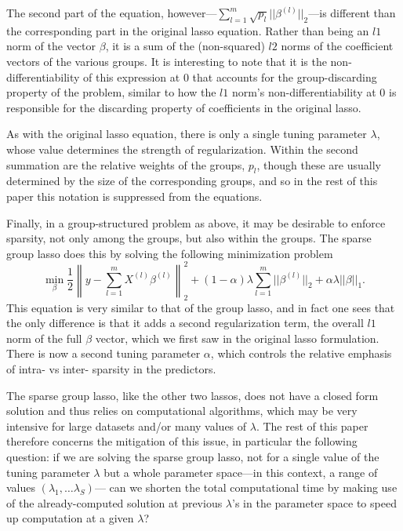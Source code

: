 \documentclass[12pt]{article}
\newcommand{\norm}[1]{\left\lVert #1 \right\rVert}
\begin{document}
The second part of the equation, however---$\sum_{l=1}^m\sqrt{p_l}||\beta^{(l)}||_2$---is different than the corresponding part in the original lasso equation. Rather than being an $l1$ norm of the vector $\beta$, it is a sum of the (non-squared) $l2$ norms of the coefficient vectors of the various groups. It is interesting to note that it is the non-differentiability of this expression at $0$ that accounts for the group-discarding property of the problem, similar to how the $l1$ norm's non-differentiability at 0 is responsible for the discarding property of coefficients in the original lasso. 

As with the original lasso equation, there is only a single tuning parameter $\lambda$, whose value determines the strength of regularization. Within the second summation are the relative weights of the groups, $p_l$, though these are usually determined by the size of the corresponding groups, and so in the rest of this paper this notation is suppressed from the equations.

Finally, in a group-structured problem as above, it may be desirable to enforce sparsity, not only among the groups, but also within the groups. The sparse group lasso \citep{simon2013sparse} does this by solving the following minimization problem
\begin{equation}
  \label{eq:sparsegl}
\min_{\beta}\frac{1}{2}\norm{y-\sum_{l=1}^mX^{(l)}\beta^{(l)}}_2^2 + (1-\alpha)\lambda\sum_{l=1}^m||\beta^{(l)}||_2+\alpha\lambda||\beta||_1.
\end{equation}
This equation is very similar to that of the group lasso, and in fact one sees that the only difference is that it adds a second regularization term, the overall $l1$ norm of the full $\beta$ vector, which we first saw in the original lasso formulation.  There is now a second tuning parameter $\alpha$, which controls the relative emphasis of intra- vs inter- sparsity in the predictors.

The sparse group lasso, like the other two lassos, does not have a closed form solution and thus relies on computational algorithms, which may be very intensive for large datasets and/or many values of $\lambda$. The rest of this paper therefore concerns the mitigation of this issue, in particular the following question: if we are solving the sparse group lasso, not for a single value of the tuning parameter $\lambda$ but a whole parameter space---in this context, a range of values $(\lambda_1,\dots \lambda_S)$--- can we shorten the total computational time by making use of the already-computed solution at previous $\lambda$'s in the parameter space to speed up computation at a given $\lambda$?
\end{document}
